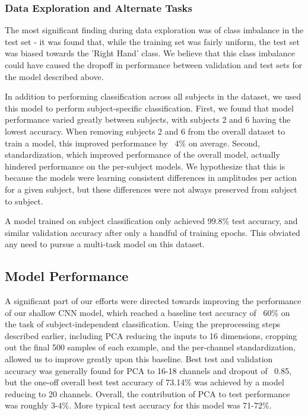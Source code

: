 \documentclass[10pt,twocolumn,letterpaper]{article}
\begin{document}

\subsubsection{Data Exploration and Alternate Tasks}

The most significant finding during data exploration was of class imbalance in the test set - it was found that, while the training set was fairly uniform, the test set was biased towards the 'Right Hand' class. We believe that this class imbalance could have caused the dropoff in performance between validation and test sets for the model described above.

In addition to performing classification across all subjects in the dataset, we
used this model to perform subject-specific classification. First, we found that model performance varied
greatly between subjects, with subjects 2 and 6 having the lowest accuracy. When removing subjects 2 and 6 from the overall dataset to train a model, this
improved performance by ~4\% on average.
Second, standardization, which improved performance of the overall model,
actually hindered performance on the per-subject models. We hypothesize that
this is because the models were learning consistent differences in amplitudes
per action for a given subject, but these differences were not always preserved
from subject to subject.

A model trained on subject classification only achieved 99.8\% test accuracy, and similar validation accuracy after only a handful of training epochs. This obviated any need to pursue a multi-task model on this dataset. 

\subsection{Model Performance}
A significant part of our efforts were directed towards improving the
performance of our shallow CNN model, which reached a baseline test accuracy of
~60\% on the task of subject-independent classification. Using the preprocessing steps described earlier, including PCA reducing the inputs to 16 dimensions, cropping out the final 500 samples of each example, and the per-channel standardization, allowed us to improve greatly upon this baseline. Best test and validation accuracy was generally
found for PCA to 16-18 channels and dropout of ~0.85, but the one-off overall best test accuracy of 73.14\% was achieved by a model reducing to 20 channels. Overall, the contribution of PCA to test performance was roughly 3-4\%. More typical test accuracy for this model was 71-72\%.
\end{document}
